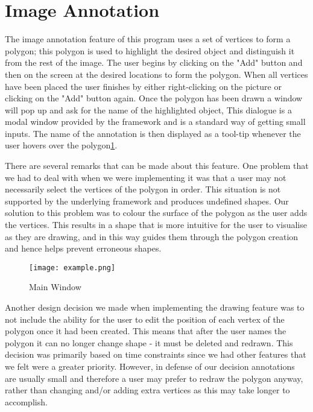 \section{Image Annotation}
The image annotation feature of this program uses a set of vertices to form a polygon; this polygon is used to highlight the desired object and distinguish it from the rest of the image. The user begins by clicking on the "Add" button and then on the screen at the desired locations to form the polygon. When all vertices have been placed the user finishes by either right-clicking on the picture or clicking on the "Add" button again.  Once the polygon has been drawn a window will pop up and ask for the name of the highlighted object, This dialogue is a modal window provided by the framework and is a standard way of getting small inputs. The name of the annotation is then displayed as a tool-tip whenever the user hovers over the polygon\ref{fig:fullView}.

There are several remarks that can be made about this feature. One problem that we had to deal with when we were implementing it was that a user may not necessarily select the vertices of the polygon in order. This situation is not supported by the underlying framework and produces undefined shapes. Our solution to this problem was to colour the surface of the polygon as the user adds the vertices. This results in a shape that is more intuitive for the user to visualise as they are drawing, and in this way guides them through the polygon creation and hence helps prevent erroneous shapes.


\begin{figure}[h!]
\centering
\texttt{[image: example.png]}
\label{fig:fullView}
\caption{Main Window}
\end{figure}

Another design decision we made when implementing the drawing feature was to not include the ability for the user to edit the position of each vertex of the polygon once it had been created. This means that after the user names the polygon it can no longer change shape - it must be deleted and redrawn. This decision was primarily based on time constraints since we had other features that we felt were a greater priority.  However, in defense of our decision annotations are usually small and therefore a user may prefer to redraw the polygon anyway, rather than changing and/or adding extra vertices as this may take longer to accomplish.
